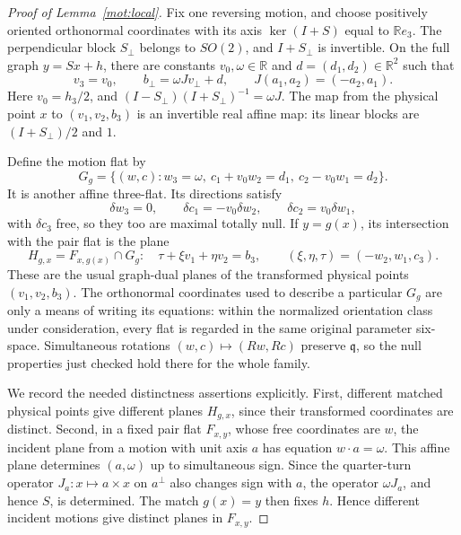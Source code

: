\begin{proof}[Proof of Lemma~\ref{mot:local}]
Fix one reversing motion, and choose positively oriented orthonormal
coordinates with its axis \(\ker(I+S)\) equal to
\(\mathbb R e_3\).  The perpendicular block \(S_\perp\) belongs
to \(SO(2)\), and \(I+S_\perp\) is invertible.  On the full graph
\(y=Sx+h\), there are constants \(v_0,\omega\in\mathbb R\) and
\(d=(d_1,d_2)\in\mathbb R^2\) such that
\begin{equation}
\label{mot:graph-cayley}
 v_3=v_0,\qquad b_\perp=\omega Jv_\perp+d,
 \qquad J(a_1,a_2)=(-a_2,a_1).
\end{equation}
Here \(v_0=h_3/2\), and
\((I-S_\perp)(I+S_\perp)^{-1}=\omega J\).
The map from the physical point \(x\) to
\((v_1,v_2,b_3)\) is an invertible real affine map: its linear
blocks are \((I+S_\perp)/2\) and \(1\).

Define the motion flat by
\begin{equation}
\label{mot:motion-flat}
 G_g=\{(w,c):w_3=\omega,\
             c_1+v_0w_2=d_1,\
             c_2-v_0w_1=d_2\}.
\end{equation}
It is another affine three-flat.  Its directions satisfy
\[
 \delta w_3=0,\qquad
 \delta c_1=-v_0\delta w_2,\qquad
 \delta c_2=v_0\delta w_1,
\]
with \(\delta c_3\) free, so they too are maximal totally null.
If \(y=g(x)\), its intersection with the pair flat is the plane
\begin{equation}
\label{mot:dual-plane}
 H_{g,x}=F_{x,g(x)}\cap G_g:
 \quad \tau+\xi v_1+\eta v_2=b_3,
 \qquad (\xi,\eta,\tau)=(-w_2,w_1,c_3).
\end{equation}
These are the usual graph-dual planes of the transformed physical
points \((v_1,v_2,b_3)\).
The orthonormal coordinates used to describe a particular \(G_g\)
are only a means of writing its equations: within the normalized
orientation class under consideration, every flat is regarded in the
same original parameter six-space.  Simultaneous rotations
\((w,c)\mapsto(Rw,Rc)\) preserve \(\mathfrak q\), so the null
properties just checked hold there for the whole family.

We record the needed distinctness assertions explicitly.
First, different matched physical points give different planes
\(H_{g,x}\), since their transformed coordinates are distinct.
Second, in a fixed pair flat \(F_{x,y}\), whose free coordinates
are \(w\), the incident plane from a motion with unit axis \(a\)
has equation \(w\cdot a=\omega\).  This affine plane determines
\((a,\omega)\) up to simultaneous sign.  Since the quarter-turn
operator \(J_a:x\mapsto a\times x\) on \(a^\perp\) also changes sign
with \(a\), the operator \(\omega J_a\), and hence \(S\), is
determined.  The match \(g(x)=y\) then fixes \(h\).  Hence different
incident motions give distinct planes in \(F_{x,y}\).


\end{proof}
